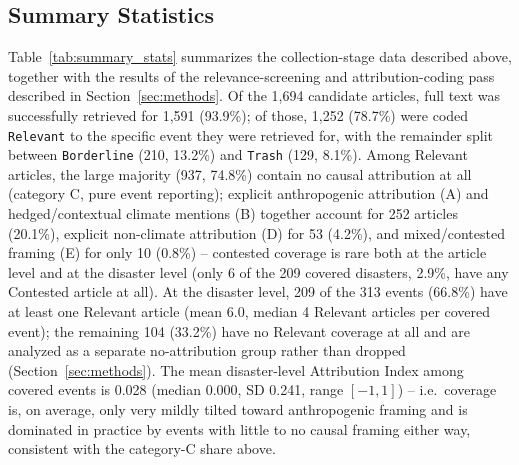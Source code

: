 \documentclass[12pt]{article}
\begin{document}
\subsection{Summary Statistics}
\label{sec:summary_stats}

Table~\ref{tab:summary_stats} summarizes the collection-stage data
described above, together with the results of the relevance-screening
and attribution-coding pass described in Section~\ref{sec:methods}.
Of the 1,694 candidate articles, full text was successfully retrieved
for 1,591 (93.9\%); of those, 1,252 (78.7\%) were coded
\texttt{Relevant} to the specific event they were retrieved for, with
the remainder split between \texttt{Borderline} (210, 13.2\%) and
\texttt{Trash} (129, 8.1\%). Among Relevant articles, the large
majority (937, 74.8\%) contain no causal attribution at all (category
C, pure event reporting); explicit anthropogenic attribution (A) and
hedged/contextual climate mentions (B) together account for 252
articles (20.1\%), explicit non-climate attribution (D) for 53
(4.2\%), and mixed/contested framing (E) for only 10 (0.8\%) --
contested coverage is rare both at the article level and at the
disaster level (only 6 of the 209 covered disasters, 2.9\%, have any
Contested article at all). At the disaster level, 209 of the 313
events (66.8\%) have at least one Relevant article (mean 6.0, median
4 Relevant articles per covered event); the remaining 104 (33.2\%)
have no Relevant coverage at all and are analyzed as a separate
no-attribution group rather than dropped (Section~\ref{sec:methods}).
The mean disaster-level Attribution Index among covered events is
0.028 (median 0.000, SD 0.241, range $[-1, 1]$) -- i.e.\ coverage is,
on average, only very mildly tilted toward anthropogenic framing and
is dominated in practice by events with little to no causal framing
either way, consistent with the category-C share above.
\end{document}
